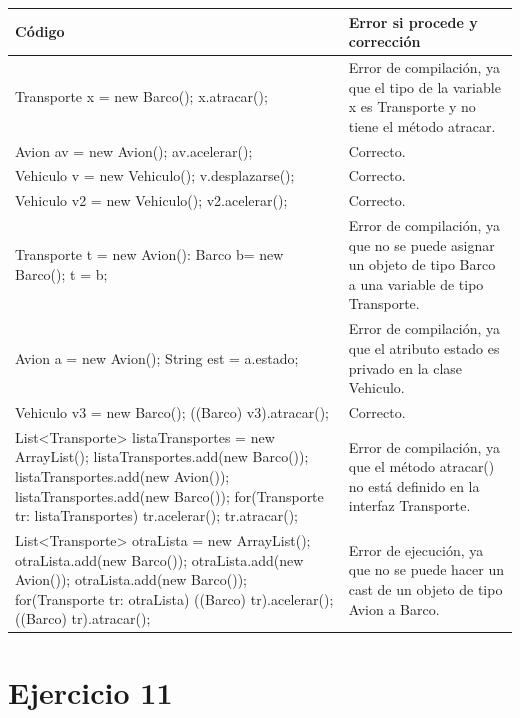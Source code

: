 \documentclass[a4paper,12pt]{article}
\begin{document}
\begin{table}[H]
    \centering
    \begin{tabular}{|p{6cm}|p{6cm}|}
        \hline
        \textbf{Código }& \textbf{Error si procede y corrección}\\
        \hline
        Transporte x = new Barco();
        x.atracar(); & Error de compilación, ya que el tipo de la variable x es Transporte y no tiene el método atracar.\\
        \hline
        Avion av = new Avion();
av.acelerar(); & Correcto.\\
        \hline
        Vehiculo v = new Vehiculo();
v.desplazarse(); & Correcto.\\
        \hline
        Vehiculo v2 = new Vehiculo();
v2.acelerar(); & Correcto.\\
        \hline
        Transporte t = new Avion():
Barco b= new Barco();
t = b; & Error de compilación, ya que no se puede asignar un objeto de tipo Barco a una variable de tipo Transporte.\\
        \hline
        Avion a = new Avion();
String est = a.estado; & Error de compilación, ya que el atributo estado es privado en la clase Vehiculo.\\
        \hline
        Vehiculo v3 = new Barco();
((Barco) v3).atracar(); & Correcto.\\
        \hline
        List<Transporte> listaTransportes = new
ArrayList();
listaTransportes.add(new Barco());
listaTransportes.add(new Avion());
listaTransportes.add(new Barco());
for(Transporte tr: listaTransportes){
tr.acelerar();
tr.atracar();}  & Error de compilación, ya que el método atracar() no está definido en la interfaz Transporte.\\
        \hline
        List<Transporte> otraLista = new ArrayList();
otraLista.add(new Barco());
otraLista.add(new Avion());
otraLista.add(new Barco());
for(Transporte tr: otraLista){
((Barco) tr).acelerar();
((Barco) tr).atracar();} & Error de ejecución, ya que no se puede hacer un cast de un objeto de tipo Avion a Barco.\\
        \hline
    \end{tabular}
\end{table}
    
\section{Ejercicio 11}
\end{document}
